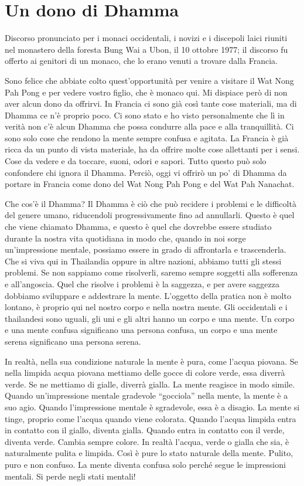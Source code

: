 \chapter{Un dono di Dhamma}

\begin{openingQuote}
  Discorso pronunciato per i monaci occidentali, i novizi e i discepoli laici
  riuniti nel monastero della foresta Bung Wai a Ubon, il 10 ottobre 1977; il
  discorso fu offerto ai genitori di un monaco, che lo erano venuti a trovare
  dalla Francia.
\end{openingQuote}

Sono felice che abbiate colto quest'opportunità per venire a visitare il
Wat Nong Pah Pong e per vedere vostro figlio, che è monaco qui. Mi
dispiace però di non aver alcun dono da offrirvi. In Francia ci sono già
così tante cose materiali, ma di Dhamma ce n'è proprio poco. Ci sono
stato e ho visto personalmente che lì in verità non c'è alcun Dhamma che
possa condurre alla pace e alla tranquillità. Ci sono solo cose che
rendono la mente sempre confusa e agitata. La Francia è già ricca da un
punto di vista materiale, ha da offrire molte cose allettanti per i
sensi. Cose da vedere e da toccare, suoni, odori e sapori. Tutto questo
può solo confondere chi ignora il Dhamma. Perciò, oggi vi offrirò un po'
di Dhamma da portare in Francia come dono del Wat Nong Pah Pong e del
Wat Pah Nanachat.

Che cos'è il Dhamma? Il Dhamma è ciò che può recidere i problemi e le
difficoltà del genere umano, riducendoli progressivamente fino ad
annullarli. Questo è quel che viene chiamato Dhamma, e questo è quel che
dovrebbe essere studiato durante la nostra vita quotidiana in modo che,
quando in noi sorge un'impressione mentale, possiamo essere in grado di
affrontarla e trascenderla. Che si viva qui in Thailandia oppure in
altre nazioni, abbiamo tutti gli stessi problemi. Se non sappiamo come
risolverli, saremo sempre soggetti alla sofferenza e all'angoscia. Quel
che risolve i problemi è la saggezza, e per avere saggezza dobbiamo
sviluppare e addestrare la mente. L'oggetto della pratica non è molto
lontano, è proprio qui nel nostro corpo e nella nostra mente. Gli
occidentali e i thailandesi sono uguali, gli uni e gli altri hanno un
corpo e una mente. Un corpo e una mente confusa significano una persona
confusa, un corpo e una mente serena significano una persona serena.

In realtà, nella sua condizione naturale la mente è pura, come l'acqua
piovana. Se nella limpida acqua piovana mettiamo delle gocce di colore
verde, essa diverrà verde. Se ne mettiamo di gialle, diverrà gialla. La
mente reagisce in modo simile. Quando un'impressione mentale gradevole
``gocciola'' nella mente, la mente è a suo agio. Quando l'impressione
mentale è sgradevole, essa è a disagio. La mente si tinge, proprio come
l'acqua quando viene colorata. Quando l'acqua limpida entra in contatto
con il giallo, diventa gialla. Quando entra in contatto con il verde,
diventa verde. Cambia sempre colore. In realtà l'acqua, verde o gialla
che sia, è naturalmente pulita e limpida. Così è pure lo stato naturale
della mente. Pulito, puro e non confuso. La mente diventa confusa solo
perché segue le impressioni mentali. Si perde negli stati mentali!

